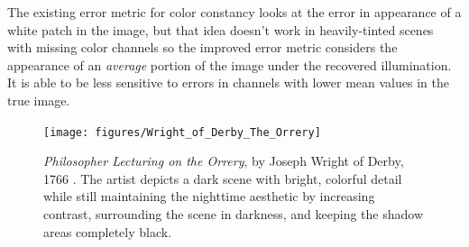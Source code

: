 \documentclass{sig-alternate}
\begin{document}
The existing error metric for color constancy looks at the error in appearance of a white patch in the image, but that idea doesn't work in heavily-tinted scenes with missing color channels so the improved error metric considers the appearance of an \emph{average} portion of the image under the recovered illumination. It is able to be less sensitive to errors in channels with lower mean values in the true image.

\begin{figure}
\centering
\texttt{[image: figures/Wright\_of\_Derby\_The\_Orrery]}
\caption{ \emph{Philosopher Lecturing on the Orrery}, by Joseph Wright of Derby, 1766 \cite{file:theOrrery}. The artist depicts a dark scene with bright, colorful detail while still maintaining the nighttime aesthetic by increasing contrast, surrounding the scene in darkness, and keeping the shadow areas completely black.~\cite{blog:Wronski2018}}
\label{fig:theOrrery}
\end{figure}
\end{document}
